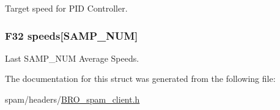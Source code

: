 Target speed for PID Controller. 

\hypertarget{structmotor__t_a4c77ff6da6be3a15bb8fe8523f3909f6}{
\subsubsection[{speeds}]{\setlength{\rightskip}{0pt plus 5cm}F32 {\bf speeds}\mbox{[}SAMP\_\-NUM\mbox{]}}}
\label{structmotor__t_a4c77ff6da6be3a15bb8fe8523f3909f6}


Last SAMP\_\-NUM Average Speeds. 



The documentation for this struct was generated from the following file:\begin{DoxyCompactItemize}
\item 
spam/headers/\hyperlink{_b_r_o__spam__client_8h}{BRO\_\-spam\_\-client.h}\end{DoxyCompactItemize}
